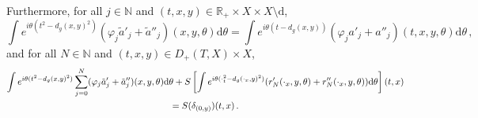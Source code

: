 \documentclass[
	fontsize=11pt, 
	twoside=false, 
	abstract=true, 
	a4paper,
]{scrartcl}
\newcommand{\RR}{\mathbb{R}}
\newcommand{\dd}{\mathrm{d}}
\newcommand{\del}{\partial}
\newcommand{\td}[1]{\tilde{#1}}
\begin{document}
\begin{lemma}
	Furthermore, for all $j\in\mathbb{N}$ and $(t,x,y) \in \RR_+\times X\times X\setminus \dd$, 
	\begin{equation}\label{eq:twoampssame}
		\int e^{i\theta(t^2-d_g(x,y)^2)} (\varphi_j\td{a}'_j+\td{a}''_j)(x,y,\theta)\dd\theta = \int e^{i\theta(t-d_g(x,y))} (\varphi_j a'_j+a''_j)(t,x,y,\theta)\dd\theta\,,
	\end{equation}
	and for all $N\in\mathbb{N}$ and $(t,x,y) \in D_+(T,X)\times X$,
	\begin{gather}
			\int e^{i\theta(t^2-d_g(x,y)^2)}\sum_{j=0}^N (\varphi_j\td{a}'_j+\td{a}''_j)(x,y,\theta)\dd\theta + S\left[\int  e^{i\theta(\cdot_t^2-d_g(\cdot_x,y)^2)}(r_N'(\cdot_x,y,\theta)+r_N''(\cdot_x,y,\theta))\dd \theta\right](t,x) \notag\\
			= S(\delta_{(0,y)})(t,x)\,.\label{eq:paranew}
	\end{gather}

\end{lemma}
\end{document}

